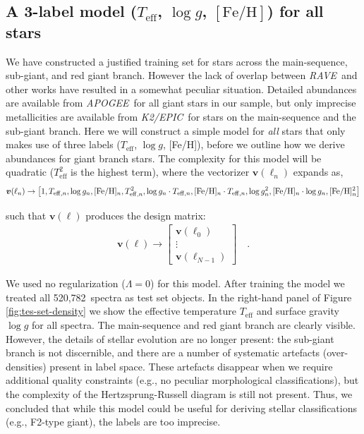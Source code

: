 \documentclass[preprint,trackchanges]{aastex}
\newcommand{\acronym}[1]{{\small{#1}}}
\newcommand{\project}[1]{\textsl{#1}}
\newcommand{\rave}{\project{\acronym{RAVE}}}
\newcommand{\apogee}{\project{\acronym{APOGEE}}}
\newcommand{\epic}{\project{K2/EPIC}}
\newcommand{\teff}{T_{\mathrm{eff}}}
\newcommand{\logg}{\log g}
\newcommand{\feh}{[\mathrm{Fe/H}]}
\newcommand{\Nspectra}{520,782}
\newcommand{\Dvector}[1]{\boldsymbol{#1}}
\newcommand{\vecv}{\Dvector{v}}
\begin{document}
\subsection{A 3-label model ($\teff$, $\logg$, $\feh$) for all stars}
\label{sec:a-simple-model}


We have constructed a justified training set for stars across the main-sequence, sub-giant,
and red giant branch.  However the lack of overlap between \rave\ and other works have
resulted in a somewhat peculiar situation.  Detailed abundances are available from \apogee\
for all giant stars in our sample, but only imprecise metallicities are available from
\epic\ for stars on the main-sequence and the sub-giant branch.  Here we will construct 
a simple model for \emph{all} stars that only makes use of three labels ($\teff$, $\logg$, 
[Fe/H]), before we outline how we derive abundances for giant branch stars.  The complexity
for this model will be quadratic ($\teff^2$ is the highest term), where the vectorizer 
$\vecv(\ell_n)$ expands as,
\begin{eqnarray}\label{eq:vectorizer-three-label}
\vecv(\ell_n) \rightarrow \left[1, T_{{\rm eff},n}, \logg_n, [{\rm Fe/H}]_n, T_{{\rm eff},n}^2, \logg_n\cdot{}T_{{\rm eff},n}, \feh_n\cdot{}T_{{\rm eff},n}, \logg_n^2, \feh_n\cdot\logg_n, \feh_n^2\right]
\end{eqnarray}

\noindent{}such that $\vecv(\ell)$ produces the design matrix:
\begin{eqnarray}
	\vecv(\ell) \rightarrow \begin{bmatrix} \vecv(\ell_0) \\ \vdots \\ \vecv(\ell_{N-1}) \end{bmatrix} \quad .
\end{eqnarray}


We used no regularization ($\Lambda = 0$) for this model.  After training the model we
treated all \Nspectra\ spectra as test set objects.  In the right-hand panel of Figure 
\ref{fig:tes-set-density} we show the effective temperature $\teff$ and surface gravity 
$\logg$ for all spectra.  The main-sequence and red giant branch are clearly visible.  
However, the details of stellar evolution are no longer present: the sub-giant branch is 
not discernible, and there are a number of systematic artefacts (over-densities) present
in label space.  These artefacts disappear when we require additional quality constraints 
(e.g., no peculiar morphological classifications), but the complexity of the 
Hertzsprung-Russell diagram is still not present.  Thus, we concluded that while this 
model could be useful for deriving stellar classifications (e.g., F2-type giant), the 
labels are too imprecise.
\end{document}
